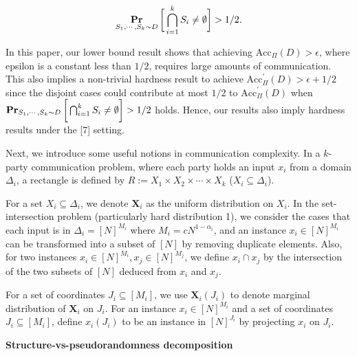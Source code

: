 \[\begin{gathered}
\operatorname*{\mathbf{Pr}}_{S_{1},\cdots,S_{k}\sim D}\bigg{[}\bigcap_{i=1}^{k}S_{i}\neq\emptyset\bigg{]}>1/2.
\end{gathered}\]


In this paper, our lower bound result shows that achieving $\text{Acc}_{\Pi}(D)>\epsilon$, where epsilon is a constant less than $1/2$, requires large amounts of communication. This also implies a non-trivial hardness result to achieve $\text{Acc}^{\prime}_{\Pi}(D)>\epsilon+1/2$ since the disjoint cases could contribute at most $1/2$ to $\text{Acc}^{\prime}_{\Pi}(D)$ when $\operatorname*{\mathbf{Pr}}_{S_{1},\cdots,S_{k}\sim D}\bigg{[}\bigcap_{i=1}^{k}S_{i}\neq\emptyset\bigg{]}>1/2$ holds. Hence, our results also imply hardness results under the [7] setting.\par




Next, we introduce some useful notions in communication complexity. In a $k$-party communication problem, where each party holds an input $x_{i}$ from a domain $\Delta_{i}$, a rectangle is defined by $R:=X_{1}\times X_{2}\times\cdots\times X_{k}$ ($X_{i}\subseteq\Delta_{i}$).\par




For a set $X_{i}\subseteq\Delta_{i}$, we denote $\bm{X}_{i}$ as the uniform distribution on $X_{i}$. In the set-intersection problem (particularly hard distribution 1), we consider the cases that each input is in $\Delta_{i}=[N]^{M_{i}}$ where $M_{i}=cN^{1-\alpha_{i}}$, and an instance $x_{i}\in[N]^{M_{i}}$ can be transformed into a subset of $[N]$ by removing duplicate elements. Also, for two instances $x_{i}\in[N]^{M_{i}},x_{j}\in[N]^{M_{j}}$, we define $x_{i}\cap x_{j}$ by the intersection of the two subsets of $[N]$ deduced from $x_{i}$ and $x_{j}$.\par




For a set of coordinates $J_{i}\subseteq[M_{i}]$, we use $\bm{X}_{i}(J_{i})$ to denote marginal distribution of $\bm{X}_{i}$ on $J_{i}$. For an instance $x_{i}\in[N]^{M_{i}}$ and a set of coordinates $J_{i}\subseteq[M_{i}]$, define $x_{i}({J_{i}})$ to be an instance in $[N]^{J_{i}}$ by projecting $x_{i}$ on $J_{i}$.\par





\par\medskip\noindent\textbf{Structure-vs-pseudorandomness decomposition}\par




